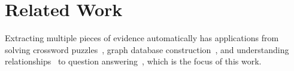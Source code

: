 \section{Related Work}
\label{sec:related}


Extracting multiple pieces of evidence automatically has applications
from solving crossword puzzles~\cite{littman2002probabilistic}, graph
database construction~\cite{de2009towards}, and understanding
relationships~\cite{chang-09c,iyyer-16} to question
answering~\cite{ferrucci2010building}, which is the focus of this
work.


